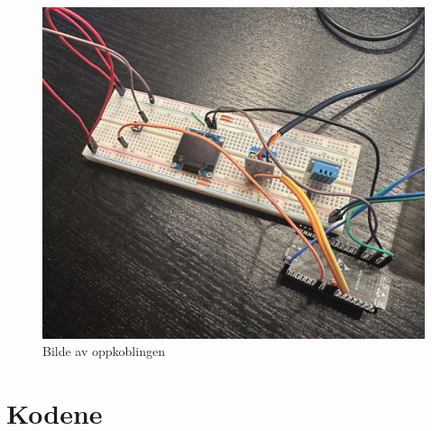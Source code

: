\documentclass{article}
\begin{document}
\begin{figure}[h!]
    \centering
    \includegraphics[width=0.8\linewidth]{Oppkobling.JPEG}
    \caption{Bilde av oppkoblingen}
    \label{fig:oppkobling}
\end{figure}

\section{Kodene}
\end{document}
